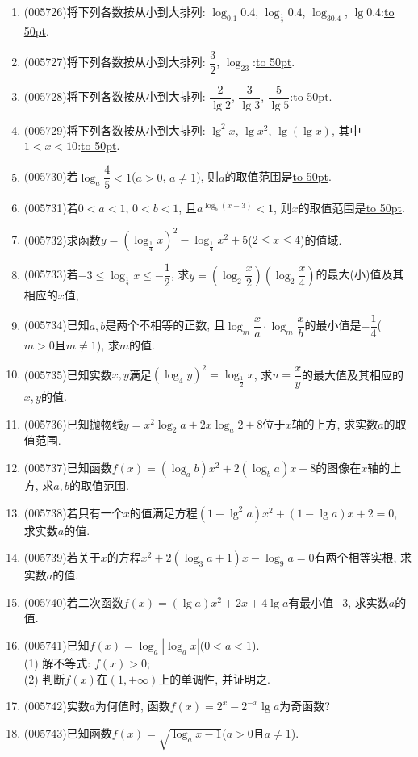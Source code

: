 \documentclass[10pt,a4paper]{article}
\newcommand{\blank}[1]{\underline{\hbox to #1pt{}}}
\begin{document}
\begin{enumerate}[1.]
\item {\tiny (005726)}将下列各数按从小到大排列: $\log_{0.1}0.4$, $\log_{\frac 12}0.4$, $\log_30.4$, $\lg 0.4$:\blank{50}.
\item {\tiny (005727)}将下列各数按从小到大排列: $\dfrac 32$, $\log_23$:\blank{50}.
\item {\tiny (005728)}将下列各数按从小到大排列: $\dfrac 2{\lg 2}$, $\dfrac 3{\lg 3}$, $\dfrac 5{\lg 5}$:\blank{50}.
\item {\tiny (005729)}将下列各数按从小到大排列: $\lg ^2x$, $\lg x^2$, $\lg (\lg x)$, 其中$1<x<10$:\blank{50}.
\item {\tiny (005730)}若$\log_a\dfrac 45<1$($a>0$, $a\ne 1$), 则$a$的取值范围是\blank{50}.
\item {\tiny (005731)}若$0<a<1$, $0<b<1$, 且$a^{\log_b(x-3)}<1$, 则$x$的取值范围是\blank{50}.
\item {\tiny (005732)}求函数$y=(\log_{\frac 14}x)^2-\log_{\frac 14}x^2+5$($2\le x\le 4$)的值域.
\item {\tiny (005733)}若$-3\le \log_{\frac 12}x\le -\dfrac 12$, 求$y=(\log_2\dfrac x2)(\log_2\dfrac x4)$的最大(小)值及其相应的$x$值,
\item {\tiny (005734)}已知$a,b$是两个不相等的正数, 且$\log_m\dfrac xa\cdot \log_m\dfrac xb$的最小值是$-\dfrac 14$($m>0$且$m\ne 1$), 求$m$的值.
\item {\tiny (005735)}已知实数$x,y$满足$(\log_4y)^2=\log_{\frac 12}x$, 求$u=\dfrac xy$的最大值及其相应的$x,y$的值.
\item {\tiny (005736)}已知抛物线$y=x^2\log_2a+2x\log_a2+8$位于$x$轴的上方, 求实数$a$的取值范围.
\item {\tiny (005737)}已知函数$f(x)=(\log_ab)x^2+2(\log_ba)x+8$的图像在$x$轴的上方, 求$a,b$的取值范围.
\item {\tiny (005738)}若只有一个$x$的值满足方程$(1-\lg ^2a)x^2+(1-\lg a)x+2=0$, 求实数$a$的值.
\item {\tiny (005739)}若关于$x$的方程$x^2+2(\log_3a+1)x-\log_9a=0$有两个相等实根, 求实数$a$的值.
\item {\tiny (005740)}若二次函数$f(x)=(\lg a)x^2+2x+4\lg a$有最小值$-3$, 求实数$a$的值.
\item {\tiny (005741)}已知$f(x)=\log_a|\log_ax|$($0<a<1$).\\
(1) 解不等式: $f(x)>0$;\\
(2) 判断$f(x)$在$(1,+\infty)$上的单调性, 并证明之.
\item {\tiny (005742)}实数$a$为何值时, 函数$f(x)=2^x-2^{-x}\lg a$为奇函数?
\item {\tiny (005743)}已知函数$f(x)=\sqrt {\log_ax-1}$($a>0$且$a\ne 1$).\\

\end{enumerate}
\end{document}
